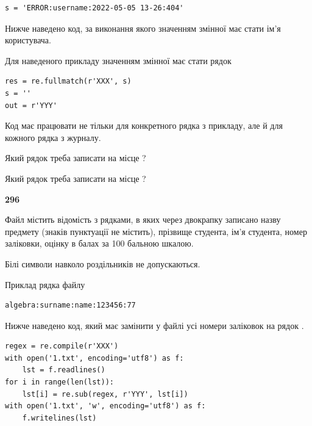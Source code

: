\begin{verbatim}
s = 'ERROR:username:2022-05-05 13-26:404'
\end{verbatim}


Нижче наведено код, за виконання якого значенням змінної  має стати ім'я користувача.

Для наведеного прикладу значенням змінної  має стати рядок 



\begin{verbatim}
res = re.fullmatch(r'XXX', s)
s = ''
out = r'YYY'
\end{verbatim}


Код має працювати не тільки для конкретного рядка з прикладу, але й для кожного рядка з журналу.




Який рядок треба записати на місце  ?\par
\vspace{5mm}


Який рядок треба записати на місце  ?\par


\newpage

{\begin {center}\textbf{ 296}\end {center}}\par
Файл  містить відомість з рядками, в яких через двокрапку записа\-но назву предмету (знаків пунктуації не містить), прізвище студента, ім'я студента, номер залі\-ков\-ки, оцінку в балах за 100 бальною шкалою.

Білі символи навколо роздільників не допускаються.

Приклад рядка файлу



\begin{verbatim}
algebra:surname:name:123456:77
\end{verbatim}


Нижче наведено код, який має замінити у файлі усі номери заліковок на рядок \code{***}.



\begin{verbatim}
regex = re.compile(r'XXX')
with open('1.txt', encoding='utf8') as f:
    lst = f.readlines()
for i in range(len(lst)):
    lst[i] = re.sub(regex, r'YYY', lst[i])
with open('1.txt', 'w', encoding='utf8') as f:
    f.writelines(lst)
\end{verbatim}







